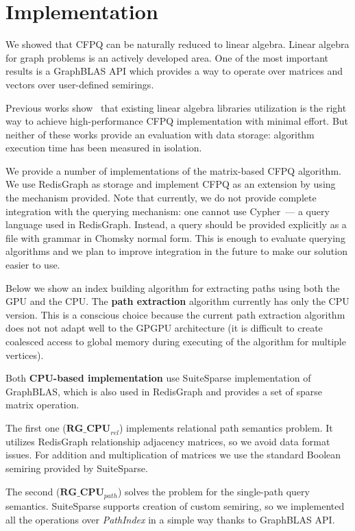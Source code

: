 \section{Implementation}

We showed that CFPQ can be naturally reduced to linear algebra.
Linear algebra for graph problems is an actively developed area.
One of the most important results is a GraphBLAS API which provides a way to operate over matrices and vectors over user-defined semirings.

Previous works show~\cite{Mishin:2019:ECP:3327964.3328503, Azimov:2018:CPQ:3210259.3210264} that existing linear algebra libraries utilization is the right way to achieve high-performance CFPQ implementation with minimal effort.
But neither of these works provide an evaluation with data storage: algorithm execution time has been measured in isolation.

We provide a number of implementations of the matrix-based CFPQ algorithm.
We use RedisGraph as storage and implement CFPQ as an extension by using the mechanism provided.
Note that currently, we do not provide complete integration with the querying mechanism: one cannot use Cypher~--- a query language used in RedisGraph.
Instead, a query should be provided explicitly as a file with grammar in Chomsky normal form.
This is enough to evaluate querying algorithms and we plan to improve integration in the future to make our solution easier to use. 

Below we show an index building algorithm for extracting paths using both the GPU and the CPU. The \textbf{path extraction} algorithm currently has only the CPU version. This is a conscious choice because the current path extraction algorithm does not not adapt well to the GPGPU architecture (it is difficult to create coalesced access to global memory during executing of the algorithm for multiple vertices).

Both \textbf{CPU-based implementation} use SuiteSparse implementation of GraphBLAS, which is also used in RedisGraph and provides a set of sparse matrix operation.

The first one ($\textbf{RG\_CPU}_{rel}$) implements relational path semantics problem. It utilizes RedisGraph relationship adjacency matrices, so we avoid data format issues. For addition and multiplication of matrices we use the standard Boolean semiring provided by SuiteSparse.

The second ($\textbf{RG\_CPU}_{path}$) solves the problem for the single-path query semantics. SuiteSparse supports creation of custom semiring, so we implemented all the operations over \textit{PathIndex} in a simple way thanks to GraphBLAS API.


